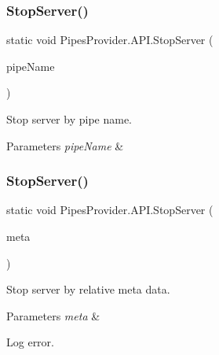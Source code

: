 \subsubsection{\texorpdfstring{Stop\+Server()}{StopServer()}\hspace{0.1cm}{\footnotesize\ttfamily [1/2]}}
{\footnotesize\ttfamily static void Pipes\+Provider.\+A\+P\+I.\+Stop\+Server (\begin{DoxyParamCaption}\item[{string}]{pipe\+Name }\end{DoxyParamCaption})\hspace{0.3cm}{\ttfamily [static]}}



Stop server by pipe name. 


\begin{DoxyParams}{Parameters}
{\em pipe\+Name} & \\
\hline
\end{DoxyParams}
\mbox{\label{class_pipes_provider_1_1_a_p_i_aec56e2367941c5cbf6501298a946b41a}} 
\subsubsection{\texorpdfstring{Stop\+Server()}{StopServer()}\hspace{0.1cm}{\footnotesize\ttfamily [2/2]}}
{\footnotesize\ttfamily static void Pipes\+Provider.\+A\+P\+I.\+Stop\+Server (\begin{DoxyParamCaption}\item[{\mbox{\hyperlink{class_pipes_provider_1_1_server_transmission_meta}{Server\+Transmission\+Meta}}}]{meta }\end{DoxyParamCaption})\hspace{0.3cm}{\ttfamily [static]}}



Stop server by relative meta data. 


\begin{DoxyParams}{Parameters}
{\em meta} & \\
\hline
\end{DoxyParams}
Log error. \mbox{\label{class_pipes_provider_1_1_a_p_i_ad57a87e88181644685a947f951b9fe0f}} 
